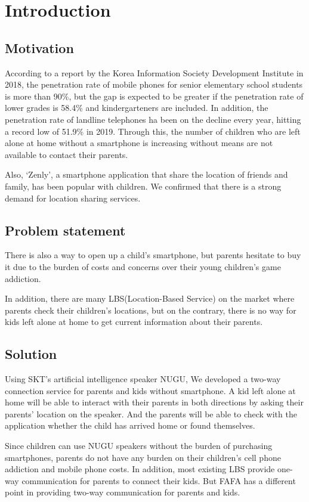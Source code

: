 \documentclass[conference]{IEEEtran}
\begin{document}
\section{Introduction}
\subsection{Motivation}
 According to a report by the Korea Information Society Development Institute in 2018, the penetration rate of mobile phones for senior elementary school students is more than 90\%, but the gap is expected to be greater if the penetration rate of lower grades is 58.4\% and kindergarteners are included. In addition, the penetration rate of landline telephones ha been on the decline every year, hitting a record low of 51.9\% in 2019. Through this, the number of children who are left alone at home without a smartphone is increasing without means are not available to contact their parents.
 
 Also, ‘Zenly’, a smartphone application that share the location of friends and family, has been popular with children. We confirmed that there is a strong demand for location sharing services.

\subsection{Problem statement}
There is also a way to open up a child’s smartphone, but parents hesitate to buy it due to the burden of costs and concerns over their young children’s game addiction.

In addition, there are many LBS(Location-Based Service) on the market where parents check their children’s locations, but on the contrary, there is no way for kids left alone at home to get current information about their parents.

\subsection{Solution}
Using SKT’s artificial intelligence speaker NUGU, We developed a two-way connection service for parents and kids without smartphone. A kid left alone at home will be able to interact with their parents in both directions by asking their parents’ location on the speaker. And the parents will be able to check with the application whether the child has arrived home or found themselves.

Since children can use NUGU speakers without the burden of purchasing smartphones, parents do not have any burden on their children’s cell phone addiction and mobile phone costs. In addition, most existing LBS provide one-way communication for parents to connect their kids. But FAFA has a different point in providing two-way communication for parents and kids.
\end{document}
